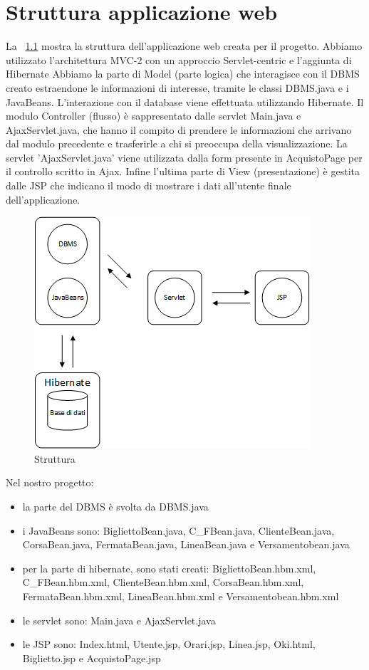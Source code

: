 \documentclass[a4paper,11pt]{book}
\begin{document}
\chapter{Struttura applicazione web}
La \figurename ~\ref{fig:struttura} mostra la struttura dell’applicazione web creata per il progetto. Abbiamo utilizzato l'architettura MVC-2 con un approccio Servlet-centric e l'aggiunta di Hibernate 
Abbiamo la parte di Model (parte logica) che interagisce con il DBMS creato estraendone le informazioni di interesse, tramite le classi DBMS.java e i JavaBeans. L'interazione con il database viene effettuata utilizzando Hibernate. Il modulo Controller (flusso) è sappresentato dalle servlet Main.java e AjaxServlet.java, che hanno il compito di prendere le informazioni che arrivano dal modulo precedente e trasferirle a chi si preoccupa della visualizzazione. La servlet 'AjaxServlet.java' viene utilizzata dalla form presente in AcquistoPage per il controllo scritto in Ajax. Infine l’ultima parte di View (presentazione) è gestita dalle JSP che indicano il modo di mostrare i dati all’utente finale dell’applicazione.


\begin{figure}[!ht]
\centering
\includegraphics[scale = 1]{Struttura.png}
\caption{Struttura}
\label{fig:struttura}
\end{figure}

\clearpage

Nel nostro progetto: 
\begin{itemize}
\item la parte del DBMS è svolta da DBMS.java 
\item i JavaBeans sono: BigliettoBean.java, C\_FBean.java, ClienteBean.java, CorsaBean.java, FermataBean.java, LineaBean.java e Versamentobean.java
\item per la parte di hibernate, sono stati creati: BigliettoBean.hbm.xml, C\_FBean.hbm.xml, ClienteBean.hbm.xml, CorsaBean.hbm.xml, FermataBean.hbm.xml, LineaBean.hbm.xml e Versamentobean.hbm.xml
\item le servlet sono: Main.java e AjaxServlet.java
\item le JSP sono: Index.html, Utente.jsp, Orari.jsp, Linea.jsp, Oki.html, Biglietto.jsp e AcquistoPage.jsp 
\end{itemize}
\end{document}
